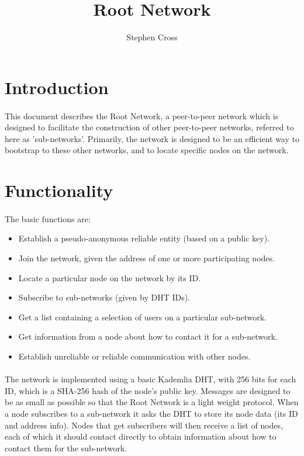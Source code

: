 \documentclass{article}
\title{Root Network}
\author{Stephen Cross}
\date{}
\begin{document}
\maketitle

\section{Introduction}

\paragraph{}
This document describes the Root Network, a peer-to-peer network which is designed to facilitate the construction of other peer-to-peer networks, referred to here as 'sub-networks'. Primarily, the network is designed to be an efficient way to bootstrap to these other networks, and to locate specific nodes on the network.

\section{Functionality}

\paragraph{}
The basic functions are:

\begin{itemize}
\item Establish a pseudo-anonymous reliable entity (based on a public key).
\item Join the network, given the address of one or more participating nodes.
\item Locate a particular node on the network by its ID.
\item Subscribe to sub-networks (given by DHT IDs).
\item Get a list containing a selection of users on a particular sub-network.
\item Get information from a node about how to contact it for a sub-network.
\item Establish unreliable or reliable communication with other nodes.
\end{itemize}

\paragraph{}
The network is implemented using a basic Kademlia DHT, with 256 bits for each ID, which is a SHA-256 hash of the node's public key. Messages are designed to be as small as possible so that the Root Network is a light weight protocol. When a node subscribes to a sub-network it asks the DHT to store its node data (its ID and address info). Nodes that get subscribers will then receive a list of nodes, each of which it should contact directly to obtain information about how to contact them for the sub-network.
\end{document}
